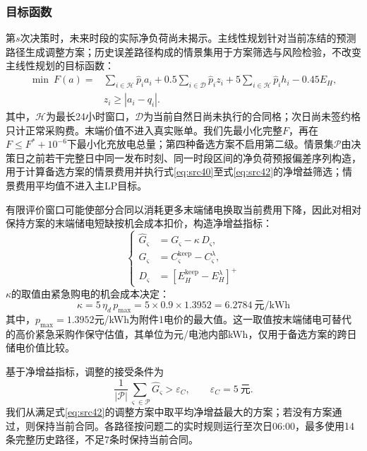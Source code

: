 \subsubsection{目标函数}

第$s$次决策时，未来时段的实际净负荷尚未揭示。主线性规划针对当前冻结的预测路径生成调整方案；历史误差路径构成的情景集用于方案筛选与风险检验，不改变主线性规划的目标函数：
\begin{equation}\label{eq:src39}
    \begin{aligned}
    \min\ F(a)={}&\sum_{i\in\mathcal H}\hat p_i a_i
    +0.5\sum_{i\in\mathcal D}\hat p_i z_i
    +5\sum_{i\in\mathcal H}\hat p_i h_i-0.45E_H,\\
    &z_i\ge |a_i-q_i|.
    \end{aligned}
\end{equation}
其中，$\mathcal H$为最长24小时窗口，$\mathcal D$为当前自然日尚未执行的合同格；次日尚未签约格只计正常采购费。末端价值不进入真实账单。我们先最小化完整$F$，再在$F\le F^*+10^{-6}$下最小化充放电总量；第四种备选方案不启用第二级。情景集$\mathcal{P}$由决策日之前若干完整日中同一发布时刻、同一时段区间的净负荷预报偏差序列构造，用于计算备选方案的情景费用并执行式\eqref{eq:src40}至式\eqref{eq:src42}的净增益筛选；情景费用平均值不进入主LP目标。


有限评价窗口可能使部分合同以消耗更多末端储电换取当前费用下降，因此对相对保持方案的末端储电短缺按机会成本扣价，构造净增益指标：
\begin{equation}\label{eq:src40}
    \left\{\begin{aligned}
    \hat{G}_{\varsigma}&=G_{\varsigma}-\kappa\,D_{\varsigma},\\[1mm]
    G_{\varsigma}&=C_{\varsigma}^{\text{keep}}-C_{\varsigma}^{\lambda},\\[1mm]
    D_{\varsigma}&=\left[E_{H}^{\text{keep}}-E_{H}^{\lambda}\right]^{+}
    \end{aligned}\right.
\end{equation}
$\kappa$的取值由紧急购电的机会成本决定：
\begin{equation}\label{eq:src41}
    \kappa=5\,\eta_{d}\,p_{\max}=5\times0.9\times1.3952=6.2784\ \text{元/kWh}
\end{equation}
其中，$p_{\max}=1.3952$元/kWh为附件1电价的最大值。这一取值按末端储电可替代的高价紧急采购作保守估值，其单位为元/电池内部kWh，仅用于备选方案的跨日储电价值比较。

基于净增益指标，调整的接受条件为
\begin{equation}\label{eq:src42}
    \dfrac{1}{\left|\mathcal{P}\right|}\sum_{\varsigma\in\mathcal{P}}\hat{G}_{\varsigma}>\varepsilon_{C},\qquad \varepsilon_{C}=5\ \text{元}.
\end{equation}
我们从满足式\eqref{eq:src42}的调整方案中取平均净增益最大的方案；若没有方案通过，则保持当前合同。各路径按问题二的实时规则运行至次日06:00，最多使用14条完整历史路径，不足7条时保持当前合同。

